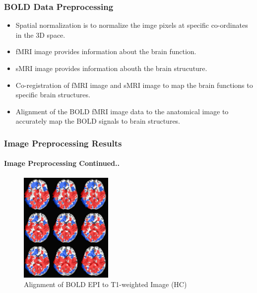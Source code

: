 \documentclass{beamer}
\begin{document}
  \begin{frame}[t]
    \frametitle{BOLD Data Preprocessing}

    \begin{itemize}

      \vskip 25pt

      \item Spatial normalization is to normalize the imge pixels at
        specific co-ordinates in the 3D space. \vskip 10pt

      \item fMRI image provides information about the brain function.
        \vskip 10pt

      \item sMRI image provides information abouth the brain
        strucuture. \vskip 10pt

      \item Co-registration of fMRI image and sMRI image to map the
        brain functions to specific brain structures. \vskip 10pt

      \item Alignment of the BOLD fMRI image data to the anatomical
        image to accurately map the BOLD signals to brain structures.
        \vskip 10pt

    \end{itemize}

  \end{frame}
  \begin{frame}[shrink=6,t]
    \frametitle{Image Preprocessing Results}
    \framesubtitle{Image Preprocessing Continued..}

      \begin{center}
    \begin{figure}[H]
      \includegraphics[width=0.4\textwidth]{./.img/aligment-test.jpg}
      \caption{Alignment of BOLD EPI to T1-weighted Image (HC)}
    \end{figure}
      \end{center}

  \end{frame}
\end{document}
